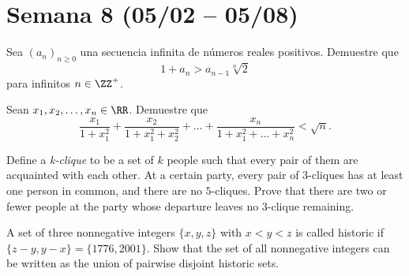 \section{Semana 8 (05/02 -- 05/08)}


\begin{probEG}
	Sea $(a_n)_{n\ge 0}$ una secuencia infinita de números reales positivos. Demuestre que
	\[1+a_n>a_{n-1}\sqrt[n]{2}\]
	para infinitos $n\in\ZZ^+$.
\end{probEG}

\begin{probMR}
	Sean $x_1,x_2,\dots,x_n\in\RR$. Demuestre que
	\[\frac{x_1}{1+x_1^2}+\frac{x_2}{1+x_1^2+x_2^2}+\dots+\frac{x_n}{1+x_1^2+\dots+x_n^2}<\sqrt{n}.\]
\end{probMR}


\begin{probEG}
	Define a \emph{k-clique} to be a set of $k$ people such that every pair of them are acquainted with each other. At a certain party, every pair of $3$-cliques has at least one person in common, and there are no $5$-cliques. Prove that there are two or fewer people at the party whose departure leaves no $3$-clique remaining.
\end{probEG}

\begin{probMB}
	A set of three nonnegative integers $\{x,y,z\}$ with $x<y<z$ is called historic if $\{z-y,y-x\}=\{1776,2001\}$. Show that the set of all nonnegative integers can be written as the union of pairwise disjoint historic sets.
\end{probMB}
